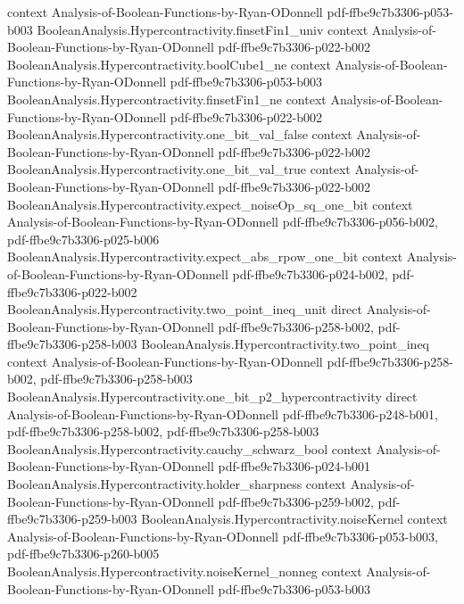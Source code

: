 \begin{lemma}
  {context}
  {Analysis-of-Boolean-Functions-by-Ryan-ODonnell}
  {pdf-ffbe9c7b3306-p053-b003}
\proofstep
  {BooleanAnalysis.Hypercontractivity.finsetFin1_univ}
  {context}
  {Analysis-of-Boolean-Functions-by-Ryan-ODonnell}
  {pdf-ffbe9c7b3306-p022-b002}
\proofstep
  {BooleanAnalysis.Hypercontractivity.boolCube1_ne}
  {context}
  {Analysis-of-Boolean-Functions-by-Ryan-ODonnell}
  {pdf-ffbe9c7b3306-p053-b003}
\proofstep
  {BooleanAnalysis.Hypercontractivity.finsetFin1_ne}
  {context}
  {Analysis-of-Boolean-Functions-by-Ryan-ODonnell}
  {pdf-ffbe9c7b3306-p022-b002}
\proofstep
  {BooleanAnalysis.Hypercontractivity.one_bit_val_false}
  {context}
  {Analysis-of-Boolean-Functions-by-Ryan-ODonnell}
  {pdf-ffbe9c7b3306-p022-b002}
\proofstep
  {BooleanAnalysis.Hypercontractivity.one_bit_val_true}
  {context}
  {Analysis-of-Boolean-Functions-by-Ryan-ODonnell}
  {pdf-ffbe9c7b3306-p022-b002}
\proofstep
  {BooleanAnalysis.Hypercontractivity.expect_noiseOp_sq_one_bit}
  {context}
  {Analysis-of-Boolean-Functions-by-Ryan-ODonnell}
  {pdf-ffbe9c7b3306-p056-b002,
    pdf-ffbe9c7b3306-p025-b006}
\proofstep
  {BooleanAnalysis.Hypercontractivity.expect_abs_rpow_one_bit}
  {context}
  {Analysis-of-Boolean-Functions-by-Ryan-ODonnell}
  {pdf-ffbe9c7b3306-p024-b002,
    pdf-ffbe9c7b3306-p022-b002}
\proofstep
  {BooleanAnalysis.Hypercontractivity.two_point_ineq_unit}
  {direct}
  {Analysis-of-Boolean-Functions-by-Ryan-ODonnell}
  {pdf-ffbe9c7b3306-p258-b002,
    pdf-ffbe9c7b3306-p258-b003}
\proofstep
  {BooleanAnalysis.Hypercontractivity.two_point_ineq}
  {context}
  {Analysis-of-Boolean-Functions-by-Ryan-ODonnell}
  {pdf-ffbe9c7b3306-p258-b002,
    pdf-ffbe9c7b3306-p258-b003}
\proofstep
  {BooleanAnalysis.Hypercontractivity.one_bit_p2_hypercontractivity}
  {direct}
  {Analysis-of-Boolean-Functions-by-Ryan-ODonnell}
  {pdf-ffbe9c7b3306-p248-b001,
    pdf-ffbe9c7b3306-p258-b002,
    pdf-ffbe9c7b3306-p258-b003}
\proofstep
  {BooleanAnalysis.Hypercontractivity.cauchy_schwarz_bool}
  {context}
  {Analysis-of-Boolean-Functions-by-Ryan-ODonnell}
  {pdf-ffbe9c7b3306-p024-b001}
\proofstep
  {BooleanAnalysis.Hypercontractivity.holder_sharpness}
  {context}
  {Analysis-of-Boolean-Functions-by-Ryan-ODonnell}
  {pdf-ffbe9c7b3306-p259-b002,
    pdf-ffbe9c7b3306-p259-b003}
\proofstep
  {BooleanAnalysis.Hypercontractivity.noiseKernel}
  {context}
  {Analysis-of-Boolean-Functions-by-Ryan-ODonnell}
  {pdf-ffbe9c7b3306-p053-b003,
    pdf-ffbe9c7b3306-p260-b005}
\proofstep
  {BooleanAnalysis.Hypercontractivity.noiseKernel_nonneg}
  {context}
  {Analysis-of-Boolean-Functions-by-Ryan-ODonnell}
  {pdf-ffbe9c7b3306-p053-b003}

\end{lemma}
